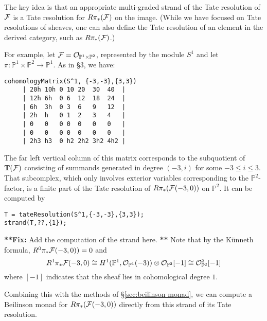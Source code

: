 \documentclass[twoside,12pt, leqno]{amsart}
\def\PP{{\mathbb P}}
\def\fix#1{{\bf ***Fix:} #1 {\bf ***}}
\def\bT{{\bf T}}
\def\bU{{\bf U}}
\begin{document}
The key idea is that an appropriate multi-graded strand of the Tate resolution of ${\mathcal F}$ is a Tate resolution for $R\pi_*({\mathcal F})$ on the image.  (While we have focused on Tate resolutions of sheaves, one can also define the Tate resolution of an element in the derived category, such as $R\pi_*({\mathcal F})$.)

For example, let $\sF=\cO_{\PP^1\times \PP^2}$, represented by the module $S^1$ and let $\pi:\PP^1\times \PP^2\to \PP^1$.  As in \S3, we have:
{\small 
\begin{verbatim}
cohomologyMatrix(S^1, {-3,-3},{3,3})
     | 20h 10h 0 10 20  30  40  |
     | 12h 6h  0 6  12  18  24  |
     | 6h  3h  0 3  6   9   12  |
     | 2h  h   0 1  2   3   4   |
     | 0   0   0 0  0   0   0   |
     | 0   0   0 0  0   0   0   |
     | 2h3 h3  0 h2 2h2 3h2 4h2 |
\end{verbatim}
} 
The far left vertical column of this matrix corresponds to the subquotient of $\bT(\sF)$ consisting of summands generated in degree $(-3,i)$ for some $-3 \leq i\leq 3$.  That subcomplex, which only involves exterior variables corresponding to the $\PP^2$-factor, is a finite part of the Tate resolution of $R\pi_*({\mathcal F}(-3,0))$ on $\PP^2$.  It can be computed by
\begin{verbatim}
T = tateResolution(S^1,{-3,-3},{3,3});
strand(T,??,{1});
\end{verbatim}
\fix{Add the computation of the strand here.}
Note that by the K\"unneth formula, $R^0\pi_* {\mathcal F}(-3,0))=0$ and
\[
R^1\pi_*\sF(-3,0)\cong H^1(\PP^1,\cO_{\PP^1}(-3))\otimes \cO_{\PP^2}[-1] \cong \cO_{\PP^2}^2[-1]
\]
where $[-1]$ indicates that the sheaf lies in cohomological degree $1$. 

Combining this with the methods of \S\ref{sec:beilinson monad}, we can compute a Beilinson monad for $R\pi_*({\mathcal F}(-3,0))$ directly from this strand of its Tate resolution.


%
%
%
\end{document}
